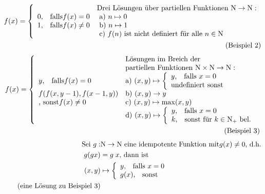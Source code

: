 \begin{compactitem}
\begin{align*}
	f(x) = 
	\left\lbrace\begin{array}{l l}
	&\text{Drei Lösungen über partiellen Funktionen } \mathrm{N} \rightarrow \mathrm{N}:\\
	0\text{,} \quad\text{falls} f(x)=0 &\text{ a) } n \mapsto 0\\
	1\text{,} \quad\text{falls} f(x)\neq0 &\text{ b) } n \mapsto 1\\
	&\text{ c) } f(n) \text{ ist nicht definiert für alle } n \in \mathrm{N}\\
	\end{array}\right.\\\tag{Beispiel 2}\\
	\end{align*}
	\begin{align*}
	f(x) = 
	\left\lbrace\begin{array}{l l}
	&\text{Lösungen im Breich der}\\
	&\text{partiellen Funktionen } \mathrm{N} \times \mathrm{N} \rightarrow \mathrm{N}:\\
	y\text{,} \quad\text{falls} f(x)=0 &\text{a) } (x,y) \mapsto
		\left\lbrace\begin{array}{l l}
		y\text{,} \quad\text{falls } x=0\\
		\text{undefiniert sonst}\\ 
		\end{array}\right.\\
	f(f(x,y-1), f(x-1,y)) &\text{b) } (x,y) \rightarrow y\\
	\text{, sonst} f(x)\neq 0 &\text{c) } (x,y) \mapsto \max(x,y)\\
	&\text{d) } (x,y) \mapsto 
		\left\lbrace\begin{array}{l l}
		y\text{,} \quad\text{falls } x=0\\
		k\text{,} \quad\text{sonst für } k \in \mathrm{N}_+ \text{ bel.}\\ 
		\end{array}\right.\\
	\end{array}\right.\\\tag{Beispiel 3}\\
	\end{align*}
	\begin{align*}
	\text{Sei } g: &\mathrm{N} \rightarrow \mathrm{N} \text{ eine idempotente Funktion mit} g(x) \neq 0 \text{, d.h.}\\
	g(g x) &= g \; x \text{, dann ist}\\
	(x,y) &\mapsto 
		\left\lbrace\begin{array}{l l}
		y\text{,} \quad\text{falls } x=0\\
		g(x)\text{,} \quad\text{sonst }\\ 
		\end{array}\right. \\\tag{eine Lösung zu Beispiel 3}\\
	\end{align*}
\end{compactitem}

